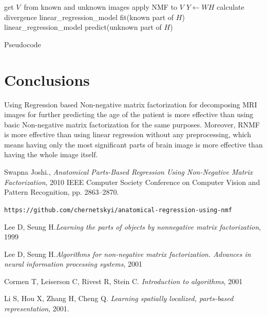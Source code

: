 \documentclass[12pt]{article}
\begin{document}
	\begin{algorithm}[H]
		get $V$\ from known and unknown images\;
		apply NMF to $V$\;
		$Y \leftarrow WH$\;
		calculate divergence\;
		linear\_regression\_model fit(known part of $H$)\;
		linear\_regression\_model predict(unknown part of $H$)\;\
		\caption{Pseudocode}
	\end{algorithm}

\section{Conclusions}

	Using Regression based Non-negative matrix factorization for decomposing MRI images for further predicting the age of the patient is more effective than using basic Non-negative matrix factorization for the same purposes. Moreover, RNMF is more effective than using linear regression without any preprocessing, which means having only the most significant parts of brain image is more effective than having the whole image itself.

\pagebreak

\begin{thebibliography}{9}
	
	Swapna Joshi., \emph{Anatomical Parts-Based Regression Using Non-Negative Matrix Factorization}, 2010 IEEE Computer Society Conference on Computer Vision and Pattern Recognition, pp. 2863–2870. 
	
	 \texttt{https://github.com/chernetskyi/anatomical-regression-using-nmf}
	
	Lee D, Seung H.\emph{Learning the parts of objects by nonnegative matrix factorization}, 1999
	
	Lee D, Seung H.\emph{Algorithms for non-negative matrix factorization. Advances in neural information processing systems}, 2001
	
	Cormen T, Leiserson C, Rivest R, Stein C. \emph{Introduction to algorithms}, 2001
	
	Li S, Hou X, Zhang H, Cheng Q. \emph{Learning spatially localized, parts-based representation}, 2001.
	
\end{thebibliography}
\end{document}
